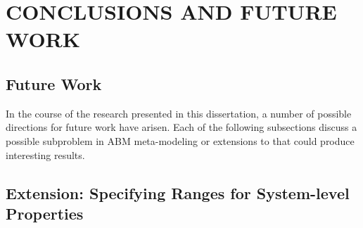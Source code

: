 \chapter{CONCLUSIONS AND FUTURE WORK}
\thispagestyle{plain}

\label{Conclusions}









\section{Future Work}

In the course of the research presented in this dissertation, a number of possible directions for future work have arisen.
Each of the following subsections discuss a possible subproblem in ABM meta-modeling or extensions to \fw that could produce interesting results.

\section{Extension: Specifying Ranges for System-level Properties}
\label{sec:ranges}

